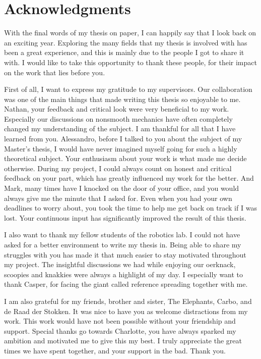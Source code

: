 \documentclass[../DC2019003Bouma.tex]{subfiles}
\begin{document}
\cleartooddpage
\chapter*{Acknowledgments}
With the final words of my thesis on paper, I can happily say that I look back on an exciting year. Exploring the many fields that my thesis is involved with has been a great experience, and this is mainly due to the people I got to share it with. I would like to take this opportunity to thank these people, for their impact on the work that lies before you.

First of all, I want to express my gratitude to my supervisors. Our collaboration was one of the main things that made writing this thesis so enjoyable to me. Nathan, your feedback and critical look were very beneficial to my work. Especially our discussions on nonsmooth mechanics have often completely changed my understanding of the subject. I am thankful for all that I have learned from you. Alessandro, before I talked to you about the subject of my Master's thesis, I would have never imagined myself going for such a highly theoretical subject. Your enthusiasm about your work is what made me decide otherwise. During my project, I could always count on honest and critical feedback on your part, which has greatly influenced my work for the better. And Mark, many times have I knocked on the door of your office, and you would always give me the minute that I asked for. Even when you had your own deadlines to worry about, you took the time to help me get back on track if I was lost. Your continuous input has significantly improved the result of this thesis.

I also want to thank my fellow students of the robotics lab. I could not have asked for a better environment to write my thesis in. Being able to share my struggles with you has made it that much easier to stay motivated throughout my project. The insightful discussions we had while enjoying our oerknack, scoopies and knakkies were always a highlight of my day. I especially want to thank Casper, for facing the giant called reference spreading together with me.

I am also grateful for my friends, brother and sister, The Elephants, Carbo, and de Raad der Stokken. It was nice to have you as welcome distractions from my work. This work would have not been possible without your friendship and support. Special thanks go towards Charlotte, you have always sparked my ambition and motivated me to give this my best. I truly appreciate the great times we have spent together, and your support in the bad. Thank you.
\end{document}
